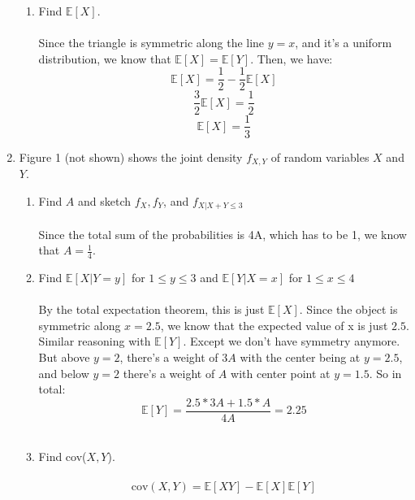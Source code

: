 \begin{enumerate}
\begin{enumerate}
      \item Find $\mathds{E}[X]$.\\\\

        Since the triangle is symmetric along the line $y = x$, and it's a uniform distribution, we know that $\mathds{E}[X] = \mathds{E}[Y]$. Then, we have:
        $$\mathds{E}[X] = \frac{1}{2} - \frac{1}{2}\mathds{E}[X]$$
        $$\frac{3}{2}\mathds{E}[X] = \frac{1}{2}$$
        $$\mathds{E}[X] = \frac{1}{3}$$
    \end{enumerate}

  \item Figure 1 (not shown) shows the joint density $f_{X,Y}$ of random variables $X$ and $Y$.
    \begin{enumerate}
      \item Find $A$ and sketch $f_X, f_Y$, and $f_{X | X+Y\leq 3}$\\\\

        Since the total sum of the probabilities is 4A, which has to be 1, we know that $A = \frac{1}{4}$.\\        
      \item Find $\mathds{E}[X | Y = y]$ for $1 \leq y \leq 3$ and $\mathds{E}[Y | X = x]$ for $1 \leq x \leq 4$\\\\

        By the total expectation theorem, this is just $\mathds{E}[X]$. Since the object is symmetric along $x = 2.5$, we know that the expected value of x is just $2.5$.\\

        Similar reasoning with $\mathds{E}[Y]$. Except we don't have symmetry anymore. But above $y = 2$, there's a weight of $3A$ with the center being at $y = 2.5$, and below $y = 2$ there's a weight of $A$ with center point at $y=1.5$. So in total:
        $$\mathds{E}[Y] = \frac{2.5*3A + 1.5*A}{4A} = 2.25$$\\
      \item Find cov($X,Y$).\\\\
        $$\text{cov}(X,Y) = \mathds{E}[XY] - \mathds{E}[X]\mathds{E}[Y]$$
    \end{enumerate}
\end{enumerate}


